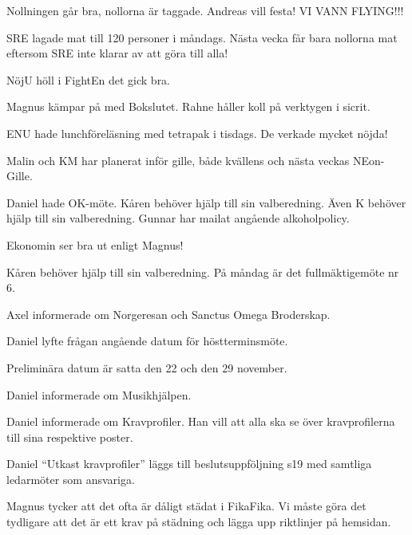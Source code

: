 \documentclass[10pt]{article}
\begin{document}
\begin{paragrafer}
\begin{paragrafer}
    Nollningen går bra, nollorna är taggade. Andreas vill festa! VI VANN FLYING!!!

    SRE lagade mat till 120 personer i måndags. Nästa vecka får bara nollorna mat eftersom SRE inte klarar av att göra till alla!

    NöjU höll i FightEn det gick bra.

    Magnus kämpar på med Bokslutet. Rahne håller koll på verktygen i sicrit.

    ENU hade lunchföreläsning med tetrapak i tisdags. De verkade mycket nöjda!

    Malin och KM har planerat inför gille, både kvällens och nästa veckas NEon-Gille. 

    Daniel hade OK-möte. Kåren behöver hjälp till sin valberedning. Även K behöver hjälp till sin valberedning. Gunnar har mailat angående alkoholpolicy.


    Ekonomin ser bra ut enligt Magnus!


    Kåren behöver hjälp till sin valberedning. På måndag är det fullmäktigemöte nr 6.

            
    Axel informerade om Norgeresan och Sanctus Omega Broderskap.        
            
    \end{paragrafer}


    Daniel lyfte frågan angående datum för höstterminsmöte.

    Preliminära datum är satta den 22 och den 29 november. 


    Daniel informerade om Musikhjälpen.


    Daniel informerade om Kravprofiler. Han vill att alla ska se över kravprofilerna till sina respektive poster.

    Daniel \ypa ``Utkast kravprofiler'' läggs till beslutsuppföljning s19 med samtliga ledarmöter som ansvariga. 
    
    \Mbaby


    Magnus tycker att det ofta är dåligt städat i FikaFika. Vi måste göra det tydligare att det är ett krav på städning och lägga upp riktlinjer på hemsidan.


\end{paragrafer}
\end{document}
